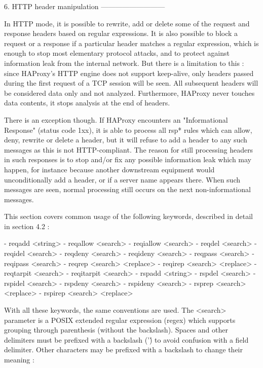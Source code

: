 6. HTTP header manipulation
---------------------------

In HTTP mode, it is possible to rewrite, add or delete some of the request and
response headers based on regular expressions. It is also possible to block a
request or a response if a particular header matches a regular expression,
which is enough to stop most elementary protocol attacks, and to protect
against information leak from the internal network. But there is a limitation
to this : since HAProxy's HTTP engine does not support keep-alive, only headers
passed during the first request of a TCP session will be seen. All subsequent
headers will be considered data only and not analyzed. Furthermore, HAProxy
never touches data contents, it stops analysis at the end of headers.

There is an exception though. If HAProxy encounters an "Informational Response"
(status code 1xx), it is able to process all rsp* rules which can allow, deny,
rewrite or delete a header, but it will refuse to add a header to any such
messages as this is not HTTP-compliant. The reason for still processing headers
in such responses is to stop and/or fix any possible information leak which may
happen, for instance because another downstream equipment would unconditionally
add a header, or if a server name appears there. When such messages are seen,
normal processing still occurs on the next non-informational messages.

This section covers common usage of the following keywords, described in detail
in section 4.2 :

  - reqadd     <string>
  - reqallow   <search>
  - reqiallow  <search>
  - reqdel     <search>
  - reqidel    <search>
  - reqdeny    <search>
  - reqideny   <search>
  - reqpass    <search>
  - reqipass   <search>
  - reqrep     <search> <replace>
  - reqirep    <search> <replace>
  - reqtarpit  <search>
  - reqitarpit <search>
  - rspadd     <string>
  - rspdel     <search>
  - rspidel    <search>
  - rspdeny    <search>
  - rspideny   <search>
  - rsprep     <search> <replace>
  - rspirep    <search> <replace>

With all these keywords, the same conventions are used. The <search> parameter
is a POSIX extended regular expression (regex) which supports grouping through
parenthesis (without the backslash). Spaces and other delimiters must be
prefixed with a backslash ('\') to avoid confusion with a field delimiter.
Other characters may be prefixed with a backslash to change their meaning :

